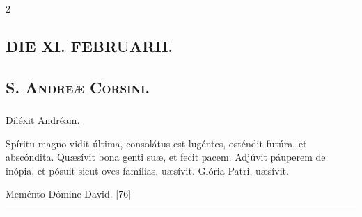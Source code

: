 \documentclass[9pt,twoside]{extarticle}
\begin{document}
\begin{multicols}{2}
\subsection*{\center \textsc{DIE XI. FEBRUARII.}}
\subsubsection*{\center {}}
\subsection*{\center \textsc{S. Andreæ Corsini.}}
\subsubsection*{\center {}}

\begin{tightlist}{}
\item {} Diléxit Andréam.
\item {}
\item {} Spíritu magno vidit última, consolátus est lugéntes, osténdit futúra, et abscóndita. \textred{*} Quæsívit bona genti suæ, et fecit pacem.  Adjúvit páuperem de inópia, et pósuit sicut oves famílias. uæsívit. Glória Patri. uæsívit.
\item {}
\item {}
\item {} Meménto Dómine David. [76]
\end{tightlist}

\begin{center}\textcolor{red}{\rule{\linewidth}{0.5pt}} \end{center}


\end{multicols}
\end{document}
